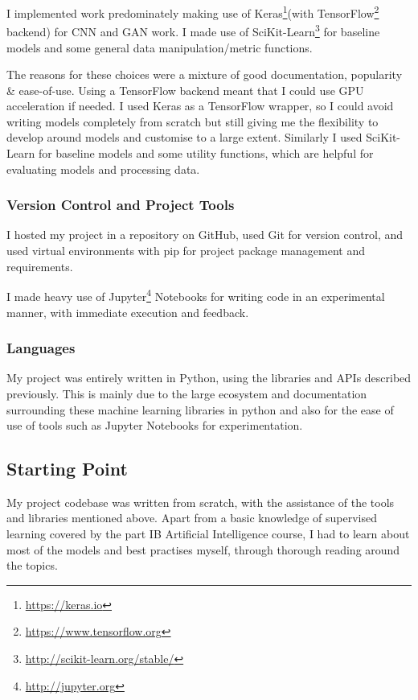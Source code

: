 \documentclass[12pt,a4paper,twoside]{report}
\begin{document}
I implemented work predominately making use of Keras\footnote{\href{https://keras.io}{https://keras.io}}(with TensorFlow\footnote{\href{https://www.tensorflow.org}{https://www.tensorflow.org}} backend) for CNN and GAN work. I made use of SciKit-Learn\footnote{\href{ http://scikit-learn.org/stable/}{ http://scikit-learn.org/stable/}} for baseline models and some general data manipulation/metric functions. 

The reasons for these choices were a mixture of good documentation, popularity \& ease-of-use. Using a TensorFlow backend meant that I could use GPU acceleration if needed. I used Keras as a TensorFlow wrapper, so I could avoid writing models completely from scratch but still giving me the flexibility to develop around models and customise to a large extent. Similarly I used SciKit-Learn for baseline models and some utility functions, which are helpful for evaluating models and processing data.

\subsubsection{Version Control and Project Tools}

I hosted my project in a repository on GitHub, used Git for version control, and used virtual environments with pip for project package management and requirements.

I made heavy use of Jupyter\footnote{\href{http://jupyter.org}{http://jupyter.org}} Notebooks for writing code in an experimental manner, with immediate execution and feedback. 


\subsubsection{Languages}

My project was entirely written in Python, using the libraries and APIs described previously. This is mainly due to the large ecosystem and documentation surrounding these machine learning libraries in python and also for the ease of use of tools such as Jupyter Notebooks for experimentation.

\subsection{Starting Point}

My project codebase was written from scratch, with the assistance of the tools and libraries mentioned above. Apart from a basic knowledge of supervised learning covered by the part IB Artificial Intelligence course, I had to learn about most of the models and best practises myself, through thorough reading around the topics. 
\end{document}
